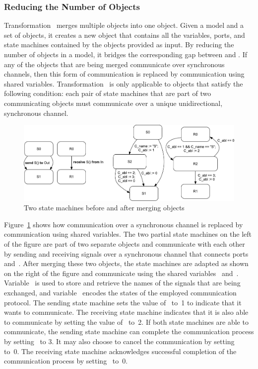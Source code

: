 \subsubsection{Reducing the Number of Objects}
\label{subsubsec:slco:merge}
Transformation~ merges multiple objects into one object.
Given a model and a set of objects, it creates a new object that contains all the variables, ports, and state machines contained by the objects provided as input.
By reducing the number of objects in a model, it bridges the corresponding gap between \SLCO and \NQC.
If any of the objects that are being merged communicate over synchronous channels, then this form of communication is replaced by communication using shared variables.
Transformation~ is only applicable to objects that satisfy the following condition: each pair of state machines that are part of two communicating objects must communicate over a unique unidirectional, synchronous channel.

\begin{figure}[hbt]
  \centering
  \includegraphics[scale=0.45]{slco/figs/transformations/MergeObjects}
  \caption{Two state machines before and after merging objects}
  \label{fig:slco:merge}
\end{figure}

Figure~\ref{fig:slco:merge} shows how communication over a synchronous channel is replaced by communication using shared variables.
The two partial state machines on the left of the figure are part of two separate objects and communicate with each other by sending and receiving signals over a synchronous channel that connects ports~ and~.
After merging these two objects, the state machines are adapted as shown on the right of the figure and communicate using the shared variables~ and~.
Variable~ is used to store and retrieve the names of the signals that are being exchanged, and variable~ encodes the states of the employed communication protocol.
The sending state machine sets the value of~ to~1 to indicate that it wants to communicate.
The receiving state machine indicates that it is also able to communicate by setting the value of~ to~2.
If both state machines are able to communicate, the sending state machine can complete the communication process by setting~ to 3.
It may also choose to cancel the communication by setting~ to~0.
The receiving state machine acknowledges successful completion of the communication process by setting~ to~0.

